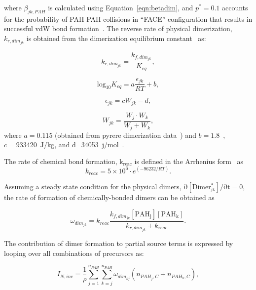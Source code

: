 \noindent where $\beta_{jk,PAH}$ is calculated using Equation~\eqref{eqn:betadim}, and ${p^{''}}=0.1$ accounts for the probability of PAH-PAH collisions in “FACE” configuration that results in successful vdW bond formation~\citep{miller1984intermolecular}. The reverse rate of physical dimerization, ${k_{r,dim_{jk}}}$ is obtained from the dimerization equilibrium constant~\citep{miller1991kinetics} as:

\begin{equation}
	k_{r,dim_{jk}} = \frac{k_{f,dim_{jk}}}{K_{eq}} 
	\label{eqn:krphydim_reacdim},
\end{equation}
	
\begin{equation}
	\mathrm{log}_{10}K_{eq}=
	a\frac{\epsilon_{jk}}{RT}+b
	\label{eqn:keq_reacdim},
\end{equation}

\begin{equation}
	\epsilon_{jk} = cW_{jk} -d
	\label{eqn:epsilon_reacdim},
\end{equation}

\begin{equation}
	W_{jk} = \frac{W_j\cdot W_k}{W_j+W_k}
	\label{eqn:Wjk_reacdim},
\end{equation}
\noindent where $a=0.115$ (obtained from pyrere dimerization data~\citep{sabbah2010exploring}) and $b=1.8$~\citep{kholghy2018reactive}, $c=933420$~J/kg, and d=34053~j/mol~\cite{kholghy2018reactive}. 

The rate of chemical bond formation, $\mathrm{k_{reac}}$ is defined in the Arrhenius form~\cite{naseri2022simulating} as
\begin{equation}
	k_{reac} = 5\times10^6\cdot e^{(-96232/RT)}
	\label{eqn:kc_reacdim}.
\end{equation}

Assuming a steady state condition for the physical dimers, $\mathrm{\partial [Dimer^*_{jk}]/\partial t=0}$, the rate of formation of chemically-bonded dimers can be obtained as

\begin{equation}
	\omega_{dim_{jk}} = k_{reac}\frac{k_{f,dim_{jk}}[\mathrm{PAH_j}][\mathrm{PAH_k}]}
	{k_{r,dim_{jk}}+k_{reac}}
	\label{eqn:chemdimer_reacdim}.
\end{equation}

The contribution of dimer formation to partial source terms is expressed by looping over all combinations of precursors as:

\begin{equation}
	I_{N,{inc}} = 
	\frac{1}{\rho}
	\sum_{j=1}^{n_{PAH}} \sum_{k=j}^{n_{PAH}}  \omega_{dim_{kj}} 
	\left(
	n_{PAH_j,C}+n_{PAH_k,C}
	\right),
	\label{eqn:IN_inc}
\end{equation}

